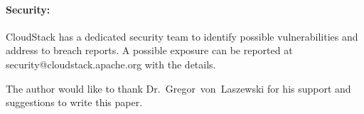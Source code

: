 \paragraph {Security:} CloudStack has a dedicated security team to identify possible vulnerabilities 
and address to breach reports. A possible exposure can be reported at security@cloudstack.apache.org
with the details.  


\begin{acks}

  The author would like to thank Dr.~Gregor~von~Laszewski for his
  support and suggestions to write this paper.

\end{acks}


 
